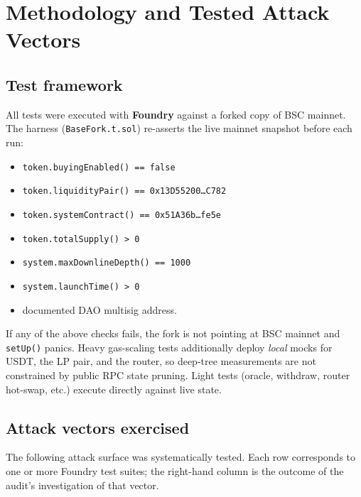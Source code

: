 \documentclass[11pt,a4paper]{article}
\begin{document}
\section{Methodology and Tested Attack Vectors}
\label{sec:methodology}

\subsection{Test framework}

All tests were executed with \textbf{Foundry} against a forked copy of BSC
mainnet. The harness (\texttt{BaseFork.t.sol}) re-asserts the live mainnet
snapshot before each run:

\begin{itemize}[leftmargin=*]
    \item \texttt{token.buyingEnabled() == false}
    \item \texttt{token.liquidityPair() == 0x13D55200\dots C782}
    \item \texttt{token.systemContract() == 0x51A36b\dots fe5e}
    \item \texttt{token.totalSupply() > 0}
    \item \texttt{system.maxDownlineDepth() == 1000}
    \item \texttt{system.launchTime() > 0}
    \item documented DAO multisig address.
\end{itemize}

If any of the above checks fails, the fork is not pointing at BSC mainnet and
\texttt{setUp()} panics.  Heavy gas-scaling tests additionally deploy
\emph{local} mocks for USDT, the LP pair, and the router, so deep-tree
measurements are not constrained by public RPC state pruning. Light tests
(oracle, withdraw, router hot-swap, etc.) execute directly against live state.

\subsection{Attack vectors exercised}

The following attack surface was systematically tested. Each row corresponds
to one or more Foundry test suites; the right-hand column is the outcome of
the audit's investigation of that vector.
\end{document}

